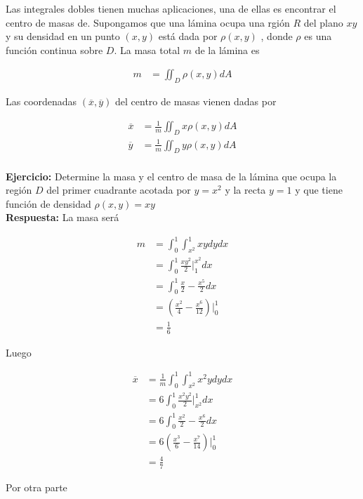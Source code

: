 \documentclass{article}
\theoremstyle{definition}
\begin{document}
Las integrales dobles tienen muchas aplicaciones, una de ellas es encontrar el centro de masas de. Supongamos que una l\'amina ocupa una rgi\'on $R$ del plano $xy$ y su densidad en un punto $(x,y)$ est\'a dada por $\rho(x,y)$ , donde $\rho $ es una funci\'on continua sobre $D$. La masa total $m$ de la l\'amina es

\begin{align*}
    m &= \iint_D \rho(x,y) dA
\end{align*}

Las coordenadas $(\overline{x},\overline{y})$ del centro de masas vienen dadas por

\begin{align*}
    \overline{x} &= \frac{1}{m} \iint_D x\rho(x,y) dA \\
    \overline{y} &= \frac{1}{m} \iint_D y\rho(x,y) dA \\
\end{align*}

\textbf{Ejercicio:} Determine la masa y el centro de masa  de la l\'amina que ocupa la regi\'on $D$ del primer cuadrante  acotada por $y=x^2$ y la recta $y=1$ y que tiene funci\'on de densidad $\rho(x,y) = xy$ \\

\textbf{Respuesta: } La masa ser\'a

\begin{align*}
    m &= \int_{0}^1\int_{x^2}^1 xy dydx \\
      &= \int_{0}^1 \frac{xy^2}{2}\bigg|_1^{x^2}dx \\
      &= \int_{0}^1 \frac{x}{2}-\frac{x^5}{2} dx \\
      &=\left(\frac{x^2}{4}-\frac{x^6}{12}\right)\bigg|_{0}^1  \\
      &= \frac{1}{6}
\end{align*}

Luego

\begin{align*}
    \overline{x} &= \frac{1}{m} \int_{0}^1\int_{x^2}^1 x^2y dydx \\
        &= 6 \int_{0}^1 \frac{x^2y^2}{2}\bigg|_{x^2}^1 dx \\
        &= 6 \int_{0}^1 \frac{x^2}{2}-\frac{x^6}{2} dx \\
        &= 6 \left( \frac{x^3}{6}-\frac{x^7}{14} \right)\bigg|_0^1\\
        &=\frac{4}{7}
\end{align*}

Por otra parte
\end{document}
